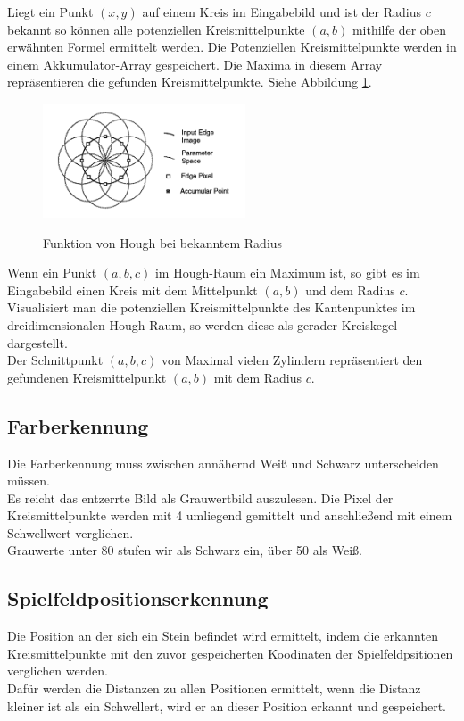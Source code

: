 \documentclass[paper=A4, deutsch]{scrartcl}
\begin{document}
Liegt ein Punkt \((x,y)\) auf einem Kreis im Eingabebild und ist der Radius \(c\) bekannt so k\"onnen alle potenziellen Kreismittelpunkte \((a,b)\) mithilfe der oben erwähnten Formel ermittelt werden. Die Potenziellen Kreismittelpunkte werden in einem Akkumulator-Array gespeichert. Die Maxima in diesem Array repräsentieren die gefunden Kreismittelpunkte.\cite{houghnote2} Siehe Abbildung \ref{fig:hough2d}.\\

\begin{figure}[ht]
	\centering
		\includegraphics[width=6cm]{2dhough_darstellung.png}\\
	\caption[Funktion von Hough bei bekanntem Radius]{Funktion von Hough bei bekanntem Radius\cite{houghnote2}}
	\label{fig:hough2d}
\end{figure}

Wenn ein Punkt \((a,b,c)\) im Hough-Raum ein Maximum ist, so gibt es im Eingabebild einen Kreis mit dem Mittelpunkt \((a,b)\) und dem Radius  \(c\).
Visualisiert man die potenziellen Kreismittelpunkte des Kantenpunktes im dreidimensionalen Hough Raum, so werden diese als gerader Kreiskegel dargestellt.\cite{houghnote1}\\ Der Schnittpunkt \((a,b,c)\) von Maximal vielen Zylindern repräsentiert den gefundenen Kreismittelpunkt \((a,b)\) mit dem Radius \( c\).


\subsection{Farberkennung}
Die Farberkennung muss zwischen annähernd Weiß und Schwarz unterscheiden müssen. \\
Es reicht das entzerrte Bild als Grauwertbild auszulesen. Die Pixel der Kreismittelpunkte
werden mit 4 umliegend gemittelt und anschließend mit einem Schwellwert verglichen.\\
Grauwerte unter 80 stufen wir als Schwarz ein, über 50 als Weiß.

\subsection{Spielfeldpositionserkennung}
Die Position an der sich ein Stein befindet wird ermittelt, indem die erkannten Kreismittelpunkte
mit den zuvor gespeicherten Koodinaten der Spielfeldpsitionen verglichen werden.\\
Dafür werden die Distanzen zu allen Positionen ermittelt, 
wenn die Distanz kleiner ist als ein Schwellert,  wird er an dieser Position erkannt und gespeichert.
\end{document}
